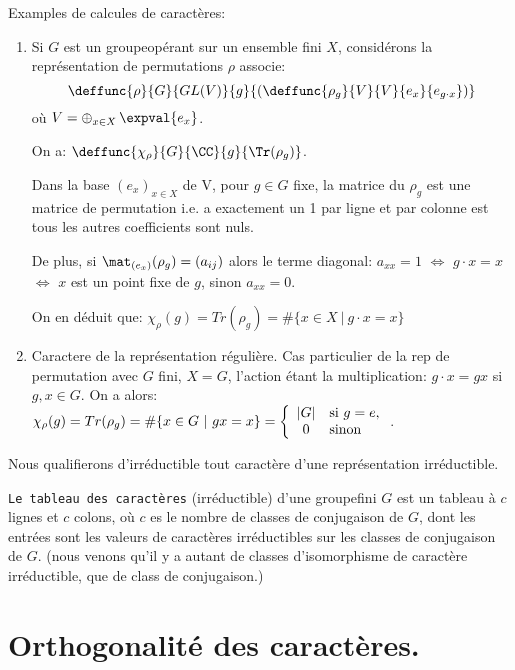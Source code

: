 \begin{examplebox}
	Examples de calcules de caractères:
\begin{enumerate}
	\item Si $G$ est un groupeopérant sur un ensemble fini $X$, considérons la représentation de permutations $\rho$ associe:
	$$\deffunc{\rho}{G}{GL(V)}{g}{\left( \deffunc{\rho_g}{V}{V}{e_x}{e_{g\cdot x}} \right)}$$
	où $V=\mathop{\oplus}_{\substack{x\in X}}\expval{e_x}$.
	
	On a: $\deffunc{\chi_\rho}{G}{\CC}{g}{\Tr(\rho_g)}$.

	Dans la base $(e_x)_{x\in X}$ de V, pour $g\in G$ fixe, la matrice du $\rho_g$ est une matrice de permutation i.e. a exactement un 1 par ligne et par colonne est tous les autres coefficients sont nuls.
	
	De plus, si $\mat_{(e_x)}(\rho_g)=(a_{ij})$ alors le terme diagonal: $a_{xx}=1$  $\Leftrightarrow$   $g\cdot x=x$  $\Leftrightarrow$  $x$ est un point fixe de $g$, sinon $a_{xx}=0$.
	
	On en déduit que: $\chi_\rho(g)=Tr(\rho_g)=\#\{x\in X\ |\ g\cdot x= x\}$
	\item Caractere de la représentation régulière.
	Cas particulier de la rep de permutation avec $G$ fini, $X=G$, l'action étant la multiplication: $g\cdot x=gx$ si $g,x\in G$.
	On a alors: $\chi_\rho(g)=Tr(\rho_g)=\#\{x\in G\ |\ gx=x\}=\left\{\begin{array}{cl}|G|&\mbox{si }g=e\mbox,\\0& \mbox{sinon }\end{array}\right.$.
\end{enumerate}
\end{examplebox}


\begin{definition}
	Nous qualifierons d'irréductible tout caractère d'une représentation irréductible.
\end{definition}
	
	\texttt{Le tableau des caractères} (irréductible) d'une groupefini $G$ est un tableau  à $c$ lignes et $c$ colons, où $c$ es le nombre de classes de conjugaison de $G$, dont les entrées sont les valeurs de caractères irréductibles sur les classes de conjugaison de $G$. (nous venons qu'il y a autant de classes d'isomorphisme de caractère irréductible, que de class de conjugaison.)
	
\section{Orthogonalité des caractères.} %

